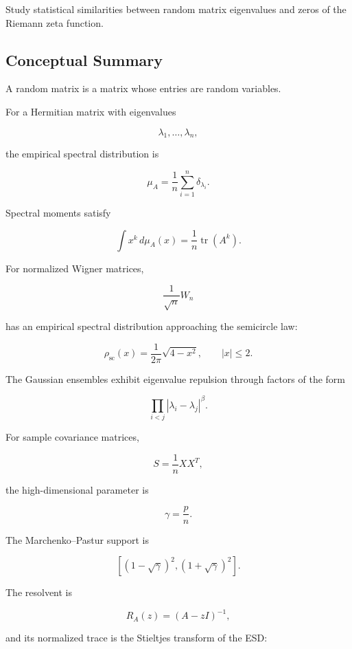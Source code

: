 \begin{exercise}[4]
Study statistical similarities between random matrix eigenvalues and
zeros of the Riemann zeta function.
\end{exercise}

\subsection{Conceptual Summary}
\label{subsec:rmt-summary}

A random matrix is a matrix whose entries are random variables.

For a Hermitian matrix with eigenvalues

\[
\lambda_1,\ldots,\lambda_n,
\]

the empirical spectral distribution is

\[
\boxed{
\mu_A
=
\frac1n
\sum_{i=1}^{n}
\delta_{\lambda_i}.
}
\]

Spectral moments satisfy

\[
\boxed{
\int x^k\,d\mu_A(x)
=
\frac1n
\operatorname{tr}(A^k).
}
\]

For normalized Wigner matrices,

\[
\boxed{
\frac1{\sqrt{n}}W_n
}
\]

has an empirical spectral distribution approaching the semicircle law:

\[
\boxed{
\rho_{\mathrm{sc}}(x)
=
\frac1{2\pi}
\sqrt{4-x^2},
\qquad
|x|\leq2.
}
\]

The Gaussian ensembles exhibit eigenvalue repulsion through factors of
the form

\[
\boxed{
\prod_{i<j}
|\lambda_i-\lambda_j|^\beta.
}
\]

For sample covariance matrices,

\[
\boxed{
S
=
\frac1nXX^T,
}
\]

the high-dimensional parameter is

\[
\boxed{
\gamma
=
\frac pn.
}
\]

The Marchenko--Pastur support is

\[
\boxed{
\left[
(1-\sqrt{\gamma})^2,
(1+\sqrt{\gamma})^2
\right].
}
\]

The resolvent is

\[
\boxed{
R_A(z)
=
(A-zI)^{-1},
}
\]

and its normalized trace is the Stieltjes transform of the ESD:

